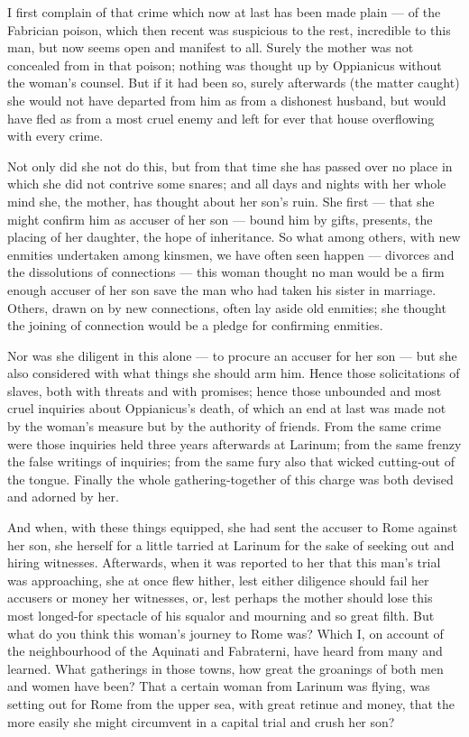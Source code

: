  I first complain of that crime which now at last has been made plain --- of the Fabrician poison, which then recent was suspicious to the rest, incredible to this man, but now seems open and manifest to all. Surely the mother was not concealed from in that poison; nothing was thought up by Oppianicus without the woman's counsel. But if it had been so, surely afterwards (the matter caught) she would not have departed from him as from a dishonest husband, but would have fled as from a most cruel enemy and left for ever that house overflowing with every crime.

 Not only did she not do this, but from that time she has passed over no place in which she did not contrive some snares; and all days and nights with her whole mind she, the mother, has thought about her son's ruin. She first --- that she might confirm him as accuser of her son --- bound him by gifts, presents, the placing of her daughter, the hope of inheritance. So what among others, with new enmities undertaken among kinsmen, we have often seen happen --- divorces and the dissolutions of connections --- this woman thought no man would be a firm enough accuser of her son save the man who had taken his sister in marriage. Others, drawn on by new connections, often lay aside old enmities; she thought the joining of connection would be a pledge for confirming enmities.

 Nor was she diligent in this alone --- to procure an accuser for her son --- but she also considered with what things she should arm him. Hence those solicitations of slaves, both with threats and with promises; hence those unbounded and most cruel inquiries about Oppianicus's death, of which an end at last was made not by the woman's measure but by the authority of friends. From the same crime were those inquiries held three years afterwards at Larinum; from the same frenzy the false writings of inquiries; from the same fury also that wicked cutting-out of the tongue. Finally the whole gathering-together of this charge was both devised and adorned by her.

 And when, with these things equipped, she had sent the accuser to Rome against her son, she herself for a little tarried at Larinum for the sake of seeking out and hiring witnesses. Afterwards, when it was reported to her that this man's trial was approaching, she at once flew hither, lest either diligence should fail her accusers or money her witnesses, or, lest perhaps the mother should lose this most longed-for spectacle of his squalor and mourning and so great filth. But what do you think this woman's journey to Rome was? Which I, on account of the neighbourhood of the Aquinati and Fabraterni, have heard from many and learned. What gatherings in those towns, how great the groanings of both men and women have been? That a certain woman from Larinum was flying, was setting out for Rome from the upper sea, with great retinue and money, that the more easily she might circumvent in a capital trial and crush her son?

